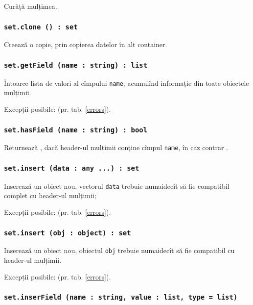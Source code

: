 Curăță mulțimea.

\subsubsection{\texttt{set.clone () : set}}

Creează o copie, prin copierea datelor în alt container.

\subsubsection{\texttt{set.getField (name : string) : list}}

Întoarce lista de valori al cîmpului \texttt{name}, acumulînd informație din toate obiectele mulțimii.

Excepții posibile:  (pr. tab. \ref{errors}).

\subsubsection{\texttt{set.hasField (name : string) : bool}}

Returnează \true, dacă header-ul mulțimii conține cîmpul \texttt{name}, în caz contrar \false.

\subsubsection{\texttt{set.insert (data : any ...) : set}}

Inserează un obiect nou, vectorul \texttt{data} trebuie numaidecît să fie compatibil complet cu header-ul mulțimii;

Excepții posibile:  (pr. tab. \ref{errors}).

\subsubsection{\texttt{set.insert (obj : object) : set}}

Inserează un obiect nou, obiectul \texttt{obj} trebuie numaidecît să fie compatibil cu header-ul mulțimii.

Excepții posibile:  (pr. tab. \ref{errors}).

\subsubsection{\texttt{set.inserField (name : string, value : list, type = list)}}

